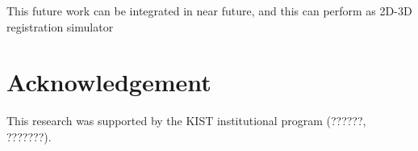 \documentclass[10pt]{article}
\begin{document}
This future work can be integrated in near future, and this can perform as 2D-3D registration simulator


\section*{Acknowledgement}
This research was supported by the KIST institutional program (??????, ???????).





%
%
%
%
%
%
%
\end{document}
